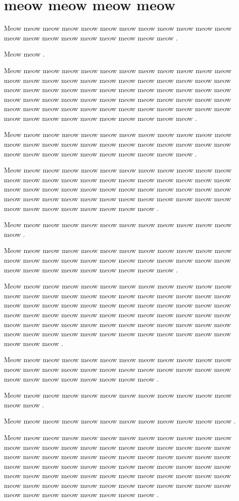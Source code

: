 \documentclass[12pt, a5paper, openany]{book}
\begin{document}
\chapter{meow meow meow meow }Meow meow meow meow meow meow meow meow meow meow meow meow meow meow meow meow meow meow meow meow meow .

Meow meow .

Meow meow meow meow meow meow meow meow meow meow meow meow meow meow meow meow meow meow meow meow meow meow meow meow meow meow meow meow meow meow meow meow meow meow meow meow meow meow meow meow meow meow meow meow meow meow meow meow meow meow meow meow meow meow meow meow meow meow meow meow meow meow meow meow meow meow meow meow meow meow .

Meow meow meow meow meow meow meow meow meow meow meow meow meow meow meow meow meow meow meow meow meow meow meow meow meow meow meow meow meow meow meow meow meow meow .

Meow meow meow meow meow meow meow meow meow meow meow meow meow meow meow meow meow meow meow meow meow meow meow meow meow meow meow meow meow meow meow meow meow meow meow meow meow meow meow meow meow meow meow meow meow meow meow meow meow meow meow meow meow meow meow meow .

Meow meow meow meow meow meow meow meow meow meow meow meow meow .

Meow meow meow meow meow meow meow meow meow meow meow meow meow meow meow meow meow meow meow meow meow meow meow meow meow meow meow meow meow meow meow meow meow .

Meow meow meow meow meow meow meow meow meow meow meow meow meow meow meow meow meow meow meow meow meow meow meow meow meow meow meow meow meow meow meow meow meow meow meow meow meow meow meow meow meow meow meow meow meow meow meow meow meow meow meow meow meow meow meow meow meow meow meow meow meow meow meow meow meow meow meow meow meow meow meow meow meow meow meow .

Meow meow meow meow meow meow meow meow meow meow meow meow meow meow meow meow meow meow meow meow meow meow meow meow meow meow meow meow meow meow meow meow .

Meow meow meow meow meow meow meow meow meow meow meow meow meow meow .

Meow meow meow meow meow meow meow meow meow meow meow meow .

Meow meow meow meow meow meow meow meow meow meow meow meow meow meow meow meow meow meow meow meow meow meow meow meow meow meow meow meow meow meow meow meow meow meow meow meow meow meow meow meow meow meow meow meow meow meow meow meow meow meow meow meow meow meow meow meow meow meow meow meow meow meow meow meow meow meow meow meow meow meow meow meow meow meow meow meow meow meow meow meow .
\end{document}
